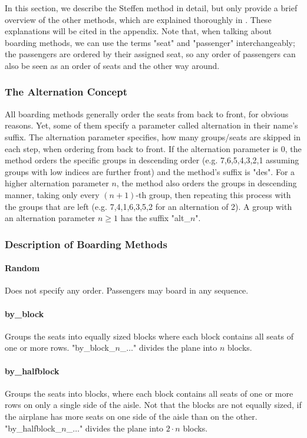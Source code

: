 \documentclass[11pt]{article}
\begin{document}
In this section, we describe the Steffen method in detail, but only provide a brief overview of the other methods, which are explained thoroughly in \cite{beus}. These explanations will be cited in the appendix. Note that, when talking about boarding methods, we can use the terms "seat" and "passenger" interchangeably; the passengers are ordered by their assigned seat, so any order of passengers can also be seen as an order of seats and the other way around.


\subsubsection{The Alternation Concept}

All boarding methods generally order the seats from back to front, for obvious reasons. Yet, some of them specify a parameter called alternation in their name's suffix. The alternation parameter specifies, how many groups/seats are skipped in each step, when ordering from back to front. If the alternation parameter is 0, the method orders the specific groups in descending order (e.g. 7,6,5,4,3,2,1 assuming groups with low indices are further front) and the method's suffix is "des". For a higher alternation parameter $n$, the method also orders the groups in descending manner, taking only every $(n+1)$-th group, then repeating this process with the groups that are left (e.g. 7,4,1,6,3,5,2 for an alternation of 2). A group with an alternation parameter $n \geq 1$ has the suffix "alt\_$n$".



\subsubsection{Description of Boarding Methods}

\paragraph{Random} Does not specify any order. Passengers may board in any sequence.
\paragraph{by\_block} Groups the seats into equally sized blocks where each block contains all seats of one or more rows. "by\_block\_$n$\_$\dots$" 
divides the plane into $n$ blocks.
\paragraph{by\_halfblock} Groups the seats into blocks, where each block contains all seats of one or more rows on only a single side of the aisle. Not that the blocks are not equally sized, if the airplane has more seats on one side of the aisle than on the other. "by\_halfblock\_$n$\_$\dots$" divides the plane into $2\cdot n$ blocks.
\end{document}

